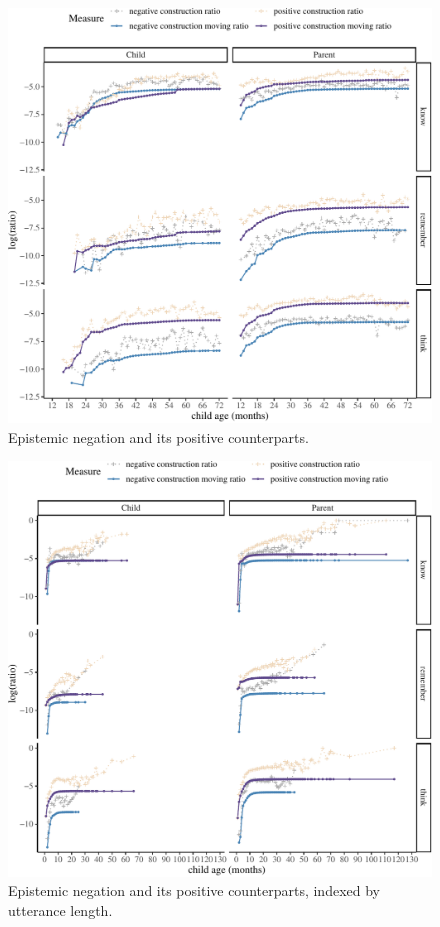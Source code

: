 \documentclass[
  english,
  man,floatsintext]{apa6}
\begin{document}
\begin{figure}[H]

{\centering \includegraphics{neg_construction_article_files/figure-latex/epistemic-1} 

}

\caption{Epistemic negation and its positive counterparts.}\label{fig:epistemic}
\end{figure}

\begin{figure}[H]

{\centering \includegraphics{neg_construction_article_files/figure-latex/epistemicul-1} 

}

\caption{Epistemic negation and its positive counterparts, indexed by utterance length.}\label{fig:epistemicul}
\end{figure}
\end{document}
